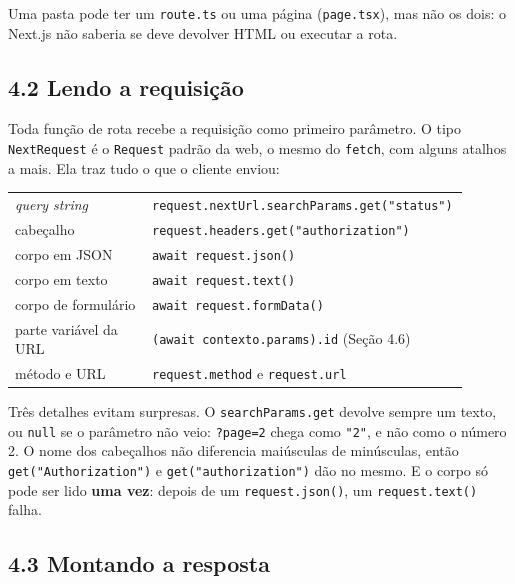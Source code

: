 Uma pasta pode ter um \texttt{route.ts} ou uma página (\texttt{page.tsx}), mas não os dois: o Next.js não saberia se deve devolver HTML ou executar a rota.

\subsection{4.2 Lendo a requisição}

Toda função de rota recebe a requisição como primeiro parâmetro. O tipo \texttt{NextRequest} é o \texttt{Request} padrão da web, o mesmo do \texttt{fetch}, com alguns atalhos a mais. Ela traz tudo o que o cliente enviou:

\begin{center}
\begin{tabular}{@{}P{0.3\linewidth}P{0.6\linewidth}@{}}
\toprule
{}
 &  \\
\midrule
\textit{query string} & \texttt{request.nextUrl.searchParams.get("status")} \\
 cabeçalho & \texttt{request.headers.get("authorization")} \\
corpo em JSON & \texttt{await request.json()} \\
 corpo em texto & \texttt{await request.text()} \\
corpo de formulário & \texttt{await request.formData()} \\
 parte variável da URL & \texttt{(await contexto.params).id} (Seção 4.6) \\
método e URL & \texttt{request.method} e \texttt{request.url} \\
\bottomrule
\end{tabular}
\end{center}

Três detalhes evitam surpresas. O \texttt{searchParams.get} devolve sempre um texto, ou \texttt{null} se o parâmetro não veio: \texttt{?page=2} chega como \texttt{"2"}, e não como o número 2. O nome dos cabeçalhos não diferencia maiúsculas de minúsculas, então \texttt{get("Authorization")} e \texttt{get("authorization")} dão no mesmo. E o corpo só pode ser lido \textbf{uma vez}: depois de um \texttt{request.json()}, um \texttt{request.text()} falha.

\subsection{4.3 Montando a resposta}

